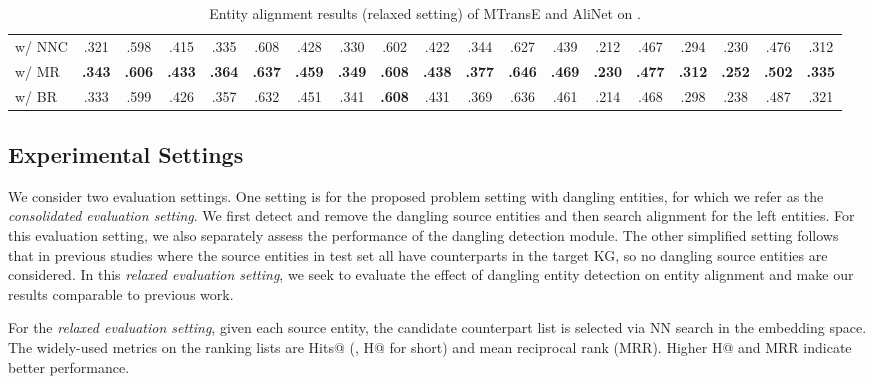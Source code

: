 \begin{table*}[!t]
{\begin{tabular}{lcccccccccccccccccc}
\;\;w/ NNC & .321 & .598 & .415 & .335 & .608 & .428 & .330 & .602 & .422 & .344 & .627 & .439 & .212 & .467 & .294 & .230 & .476 & .312 \\
\;\;w/ MR & \textbf{.343} & \textbf{.606} & \textbf{.433} & \textbf{.364} & \textbf{.637} & \textbf{.459} & \textbf{.349} & \textbf{.608} & \textbf{.438} & \textbf{.377} & \textbf{.646} & \textbf{.469} & \textbf{.230} & \textbf{.477} & \textbf{.312} & \textbf{.252} & \textbf{.502} & \textbf{.335}\\
\;\;w/ BR & .333 & .599 & .426 & .357 & .632 & .451 & .341 & \textbf{.608} & .431 & .369 & .636 & .461 & .214 & .468 & .298 & .238 & .487 & .321 \\
			\bottomrule
	\end{tabular}}
	\caption{Entity alignment results (relaxed setting) of MTransE and AliNet on \dataset.}
	\label{tab:synthetic_ent_alignment}
\end{table*}

\subsection{Experimental Settings}\label{sec:setting}
We consider two evaluation settings. 
One setting is for the proposed problem setting with dangling entities, for which we refer as the \emph{consolidated evaluation setting}. 
We first detect and remove the dangling source entities and then search alignment for the left entities.
For this evaluation setting, we also separately assess the performance of the dangling detection module.
The other simplified setting follows that in previous studies \cite{JAPE,OpenEA} where the source entities in test set all have counterparts in the target KG, so no dangling source entities are considered. 
In this \emph{relaxed evaluation setting}, we seek to evaluate the effect of dangling entity detection on entity alignment and make our results comparable to previous work. 

For the \emph{relaxed evaluation setting}, given each source entity, the candidate counterpart list is selected via NN search in the embedding space. 
The widely-used metrics on the ranking lists are Hits@ (, H@ for short) and mean reciprocal rank (MRR).
Higher H@ and MRR indicate better performance.

